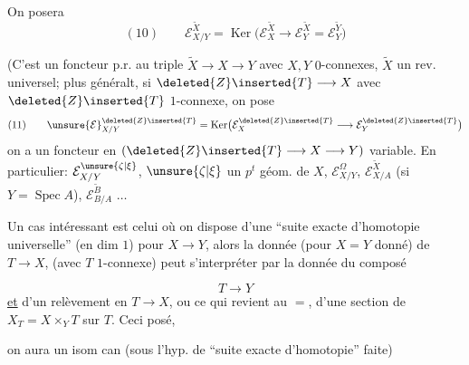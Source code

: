 On posera
\[
(10)\qquad \mathcal E_{X/Y}^{\widetilde X}=\operatorname{Ker}\bigl(\mathcal E_X^{\widetilde X}\longrightarrow\mathcal E_Y^{\widetilde X}=\mathcal E_Y^{\widetilde Y}\bigr)
\]



(C'est un foncteur p.r. au triple $\widetilde X\longrightarrow X\longrightarrow Y$ avec $X,Y$ $0$-connexes, $\widetilde X$ un rev. universel; plus généralt, si $\deleted{Z}\inserted{T}\longrightarrow X$ avec $\deleted{Z}\inserted{T}$ $1$-connexe, on pose
\[
(11)\qquad \unsure{\mathcal E}_{X/Y}^{\deleted{Z}\inserted{T}}=\operatorname{Ker}\bigl(\mathcal E_X^{\deleted{Z}\inserted{T}}\longrightarrow\mathcal E_Y^{\deleted{Z}\inserted{T}}\bigr)
\]
on a un foncteur en  $(\deleted{Z}\inserted{T}\longrightarrow X\longrightarrow Y)$ variable. En particulier: $\mathcal E_{X/Y}^{\unsure{\zeta|\xi}}$, $\unsure{\zeta|\xi}$ un $p^t$ géom. de $X$, $\mathcal E_{X/Y}^{\Omega}$, $\mathcal E_{X/A}^{\widetilde X}$ (si $Y=\operatorname{Spec} A$), $\mathcal E_{B/A}^{\widetilde B}$ $\ldots$


Un cas intéressant est celui où on dispose d'une ``suite exacte d'homotopie universelle''  (en dim $1$) pour $X\longrightarrow Y$, alors la donnée (pour $X=Y$ donné) de $T\longrightarrow X$, (avec $T$ $1$-connexe) peut s'interpréter par la donnée du composé



\[
T\longrightarrow Y
\]
\uline{et} d'un relèvement en $T\longrightarrow X$, ou ce qui revient au $=$, d'une section de $X_T=X\times_YT$ sur $T$. Ceci posé,

\noindent
\begin{minipage}[t]{0.48\linewidth}
\vspace*{\baselineskip}
\end{minipage}\hfill
\begin{minipage}[t]{0.48\linewidth}
on aura un isom can (sous l'hyp. de ``suite exacte d'homotopie'' \deleted{\unsure{)}} faite)
\end{minipage}

